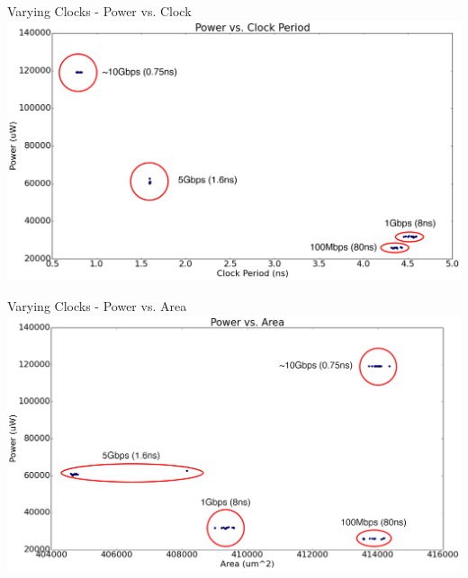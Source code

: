 \documentclass{beamer}
\begin{document}
\begin{frame}{Varying Clocks - Power vs. Clock}
\noindent
\includegraphics[width=1.0\textwidth]{../img/dse_all/powerVSclock.png}
\end{frame}




\begin{frame}{Varying Clocks - Power vs. Area}
\noindent
\includegraphics[width=1.0\textwidth]{../img/dse_all/powerVSarea.png}
\end{frame}





\begin{frame}

    
\end{frame}



\begin{frame}
    
\end{frame}
\end{document}
